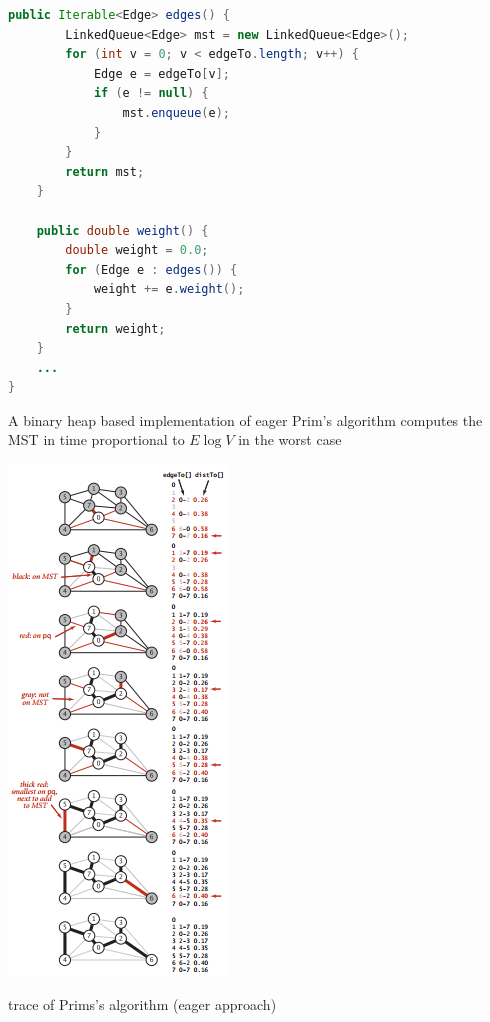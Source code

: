 \documentclass[8pt,a4paper,compress]{beamer}
\begin{document}
\begin{frame}[fragile]
\begin{minipage}{240pt}
\begin{lstlisting}[language=Java]
    public Iterable<Edge> edges() {
        LinkedQueue<Edge> mst = new LinkedQueue<Edge>();
        for (int v = 0; v < edgeTo.length; v++) {
            Edge e = edgeTo[v];
            if (e != null) { 
                mst.enqueue(e); 
            }
        }
        return mst;
    }

    public double weight() {
        double weight = 0.0;
        for (Edge e : edges()) { 
            weight += e.weight(); 
        }
        return weight;
    }
    ...
}
\end{lstlisting}

A binary heap based implementation of eager Prim's algorithm computes the MST in time proportional to $E \log V$ in the worst case
\end{minipage}%
\begin{minipage}{90pt}
\begin{center}
\includegraphics[scale=0.4]{./figures/mst6.png}

\smallskip

\tiny trace of Prims's algorithm (eager approach)
\end{center}
\end{minipage}
\end{frame}
\end{document}
